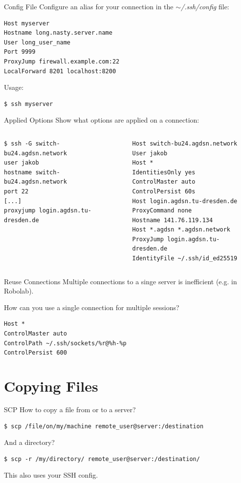\documentclass[10pt,graphics,aspectratio=169,table]{beamer}
\begin{document}
\begin{frame}[fragile]{Config File}
	Configure an alias for your connection in the \textit{$\sim$/.ssh/config} file:
	\begin{lstlisting}
Host myserver
Hostname long.nasty.server.name
User long_user_name
Port 9999
ProxyJump firewall.example.com:22
LocalForward 8201 localhost:8200
	\end{lstlisting}
	
	Usage:
	\begin{lstlisting}
$ ssh myserver
	\end{lstlisting}
\end{frame}

\begin{frame}[fragile]{Applied Options}
	Show what options are applied on a connection:
	\begin{columns}
		\begin{lstlisting}
$ ssh -G switch-bu24.agdsn.network
user jakob
hostname switch-bu24.agdsn.network
port 22
[...]
proxyjump login.agdsn.tu-dresden.de
		\end{lstlisting}
		\begin{lstlisting}
Host switch-bu24.agdsn.network
User jakob
Host *
IdentitiesOnly yes
ControlMaster auto
ControlPersist 60s
Host login.agdsn.tu-dresden.de
ProxyCommand none
Hostname 141.76.119.134
Host *.agdsn *.agdsn.network
ProxyJump login.agdsn.tu-dresden.de
IdentityFile ~/.ssh/id_ed25519
		\end{lstlisting}
    \end{columns}
\end{frame}

\begin{frame}[fragile]{Reuse Connections}
	Multiple connections to a singe server is inefficient (e.g. in Robolab).

	How can you use a single connection for multiple sessions?
	\begin{lstlisting}
Host *
ControlMaster auto
ControlPath ~/.ssh/sockets/%r@%h-%p
ControlPersist 600
	\end{lstlisting}
\end{frame}

\section{Copying Files}
\begin{frame}[fragile]{SCP}
	How to copy a file from or to a server?
	\begin{lstlisting}
$ scp /file/on/my/machine remote_user@server:/destination
	\end{lstlisting}
	And a directory?
	\begin{lstlisting}
$ scp -r /my/directory/ remote_user@server:/destination/
	\end{lstlisting}
	This also uses your SSH config.
\end{frame}
\end{document}
